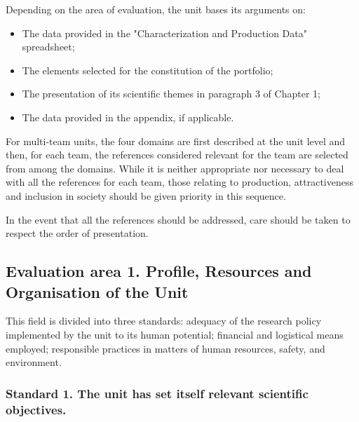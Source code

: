 %


\begin{hceresinstructions}
  Depending on the area of evaluation, the unit bases its arguments on:

  \begin{itemize}
  \item
    The data provided in the "Characterization and Production Data"
    spreadsheet;
  \item
    The elements selected for the constitution of the portfolio;
  \item
    The presentation of its scientific themes in paragraph 3 of Chapter 1;
  \item
    The data provided in the appendix, if applicable.
  \end{itemize}

  For multi-team units, the four domains are first described at the unit
  level and then, for each team, the references considered relevant for
  the team are selected from among the domains. While it is neither
  appropriate nor necessary to deal with all the references for each team,
  those relating to production, attractiveness and inclusion in society
  should be given priority in this sequence.

  In the event that all the references should be addressed, care should be
  taken to respect the order of presentation.
\end{hceresinstructions}

\subsection*{Evaluation area 1. Profile, Resources and Organisation of the Unit}

\begin{hceresinstructions}
  This field is divided into three standards: adequacy of the research
  policy implemented by the unit to its human potential; financial and
  logistical means employed; responsible practices in matters of human
  resources, safety, and environment.
\end{hceresinstructions}

\subsubsection*{Standard 1. The unit has set itself relevant scientific
objectives.}

